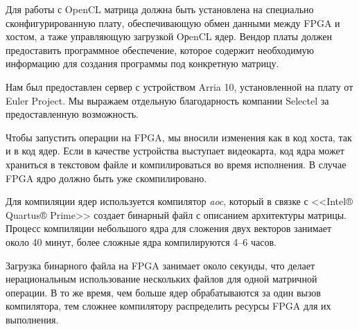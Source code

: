 \documentclass[14pt]{extarticle}
\newcommand{\txt}{\textit}
\begin{document}
	Для работы с OpenCL матрица должна быть установлена на специально сконфигурированную плату, обеспечивающую обмен данными между FPGA и хостом, а таже управляющую загрузкой OрenCL ядер. Вендор платы должен предоставить программное обеспечение, которое содержит необходимую информацию для создания программы под конкретную матрицу. 
	
	Нам был предоставлен сервер с устройством Arria 10, установленной на плату от Euler Project. Мы выражаем отдельную благодарность компании Selectel за предоставленную возможность.

	Чтобы запустить операции на FPGA, мы вносили изменения как в код хоста, так и в код ядер. Если в качестве устройства выступает видеокарта, код ядра может храниться в текстовом файле и компилироваться во время исполнения. В случае FPGA ядро должно быть уже скомпилировано.
	
	Для компиляции ядер используется компилятор \txt{aoc}, который в связке с <<Intel® Quartus® Prime>> создает бинарный файл с описанием архитектуры матрицы. Процесс компиляции небольшого ядра для сложения двух векторов занимает около 40 минут, более сложные ядра компилируются 4--6 часов.
	
	Загрузка бинарного файла на FPGA занимает около секунды, что делает нерациональным использование нескольких файлов для одной матричной операции. В то же время, чем больше ядер обрабатываются за один вызов компилятора, тем сложнее компилятору распределить ресурсы FPGA для их выполнения. 
	
%	
%	
%
%
	
\end{document}
